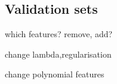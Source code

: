 
\subsection{Validation sets}

which features? remove, add?

change lambda,regularisation

change polynomial features

